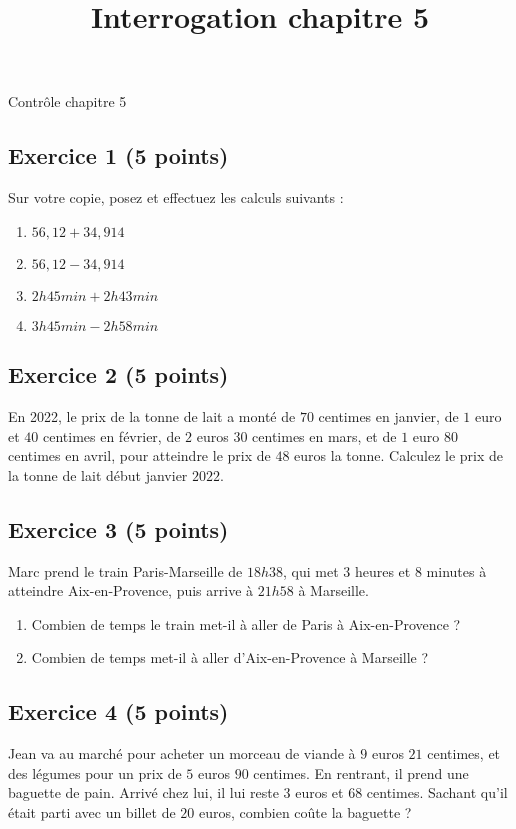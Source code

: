 \documentclass[14 pt]{extarticle}
\title{Interrogation chapitre 5}
\date{}
\theoremstyle{plain}
\begin{document}
\begin{center}{\Large Contrôle chapitre 5}\\ 
 \end{center}
 
 
  \subsection*{Exercice 1 (5 points)}
  
Sur votre copie, posez et effectuez les calculs suivants : \begin{enumerate}
\item $56,12 + 34, 914$
\item $56,12 - 34, 914$
\item $2 h 45 min + 2h 43 min$
\item $3 h 45 min - 2h 58 min$
\end{enumerate}  

\subsection*{Exercice 2 (5 points)}

En 2022, le prix de la tonne de lait a monté de $70$ centimes en janvier, de $1$ euro et $40$ centimes en février, de $2$ euros $30$ centimes en mars, et de $1$ euro $80$ centimes en avril, pour atteindre le prix de $48$ euros la tonne. Calculez le prix de la tonne de lait début janvier $2022$. 


\subsection*{Exercice 3 (5 points)}

Marc prend le train Paris-Marseille de $18h38$, qui met $3$ heures et $8$ minutes à atteindre Aix-en-Provence, puis arrive à $21h58$ à Marseille.
\begin{enumerate}
\item Combien de temps le train met-il à aller de Paris à Aix-en-Provence ? 
\item Combien de temps met-il à aller d'Aix-en-Provence à Marseille ? 
\end{enumerate} 




\subsection*{Exercice 4 (5 points)}

Jean va au marché pour acheter un morceau de viande à $9$ euros $21$ centimes, et des légumes pour un prix de $5$ euros $90$ centimes. En rentrant, il prend une baguette de pain. Arrivé chez lui, il lui reste $3$ euros et $68$ centimes. Sachant qu'il était parti avec un billet de $20$ euros, combien coûte la baguette ?
  
\end{document}
